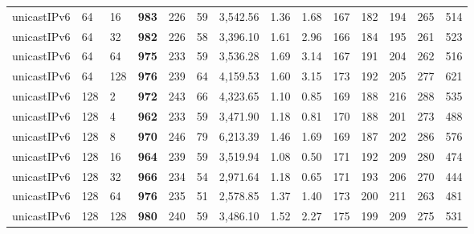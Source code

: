 \begin{table}[!htb]
\begin{tabular}{@{}llllllllllllll@{}}
		unicastIPv6 & 64           & 16    & \textbf{983}  & 226  & 59  & 3,542.56 & 1.36     & 1.68     & 167 & 182 & 194 & 265 & 514  \\
		unicastIPv6 & 64           & 32    & \textbf{982}  & 226  & 58  & 3,396.10 & 1.61     & 2.96     & 166 & 184 & 195 & 261 & 523  \\
		unicastIPv6 & 64           & 64    & \textbf{975}  & 233  & 59  & 3,536.28 & 1.69     & 3.14     & 167 & 191 & 204 & 262 & 516  \\
		unicastIPv6 & 64           & 128   & \textbf{976}  & 239  & 64  & 4,159.53 & 1.60     & 3.15     & 173 & 192 & 205 & 277 & 621  \\ \hline
		unicastIPv6 & 128          & 2     & \textbf{972}  & 243  & 66  & 4,323.65 & 1.10     & 0.85     & 169 & 188 & 216 & 288 & 535  \\
		unicastIPv6 & 128          & 4     & \textbf{962}  & 233  & 59  & 3,471.90 & 1.18     & 0.81     & 170 & 188 & 201 & 273 & 488  \\
		unicastIPv6 & 128          & 8     & \textbf{970}  & 246  & 79  & 6,213.39 & 1.46     & 1.69     & 169 & 187 & 202 & 286 & 576  \\
		unicastIPv6 & 128          & 16    & \textbf{964}  & 239  & 59  & 3,519.94 & 1.08     & 0.50     & 171 & 192 & 209 & 280 & 474  \\
		unicastIPv6 & 128          & 32    & \textbf{966}  & 234  & 54  & 2,971.64 & 1.18     & 0.65     & 171 & 193 & 206 & 270 & 444  \\
		unicastIPv6 & 128          & 64    & \textbf{976}  & 235  & 51  & 2,578.85 & 1.37     & 1.40     & 173 & 200 & 211 & 263 & 481  \\
		unicastIPv6 & 128          & 128   & \textbf{980}  & 240  & 59  & 3,486.10 & 1.52     & 2.27     & 175 & 199 & 209 & 275 & 531  \\ \bottomrule
	\end{tabular}
\end{table}




